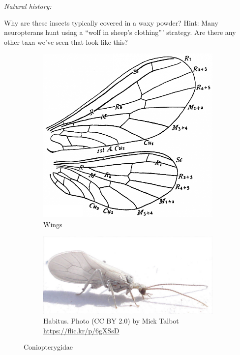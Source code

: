\documentclass[letterpaper, 11pt]{article}
\begin{document}
\noindent{}\textit{Natural history:} %

\noindent{}Why are these insects typically covered in a waxy powder? Hint: Many neuropterans hunt using a ``wolf in sheep's clothing''' strategy. Are there any other taxa we've seen that look like this? \vspace{3cm}

\begin{figure}[ht!]
    \centering
    \begin{subfigure}[ht!]{0.34\textwidth}
        \includegraphics[width=\textwidth]{ConiopterygidWing}
        \caption{Wings \citep[][Fig. 211]{comstock1918wings}}
        \label{fig:coniopterygid1}
    \end{subfigure}
    \qquad
    \begin{subfigure}[ht!]{0.5\textwidth}
        \includegraphics[width=\textwidth]{ConiopterygidHabitus}
        \caption{Habitus. Photo (CC BY 2.0) by Mick Talbot \url{https://flic.kr/p/6gXSsD}}
        \label{fig:coniopterygid2}
    \end{subfigure}
    \caption{Coniopterygidae}\label{fig:coniopterygids}
\end{figure}
\end{document}
